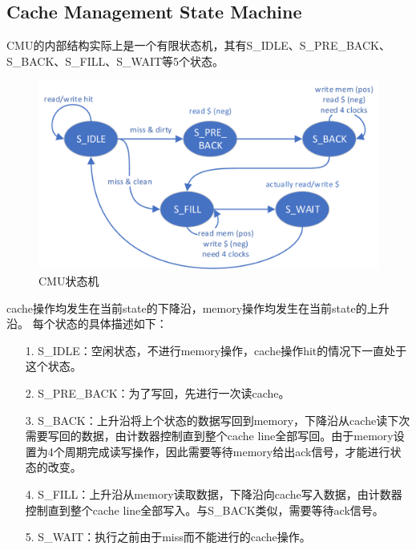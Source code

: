 \subsection{Cache Management State Machine}
CMU的内部结构实际上是一个有限状态机，其有S\_IDLE、S\_PRE\_BACK、S\_BACK、S\_FILL、S\_WAIT等5个状态。
\begin{figure}[H] %
	\centering %
	\includegraphics[width=1.0\textwidth]{figs/2.png} %
	\caption{CMU状态机} %
	\label{Fig.3} %
\end{figure}
cache操作均发生在当前state的下降沿，memory操作均发生在当前state的上升沿。 每个状态的具体描述如下：
\begin{itemize}
	\item [1.] S\_IDLE：空闲状态，不进行memory操作，cache操作hit的情况下一直处于这个状态。
	\item [2.] S\_PRE\_BACK：为了写回，先进行一次读cache。
	\item [3.] S\_BACK：上升沿将上个状态的数据写回到memory，下降沿从cache读下次需要写回的数据，由计数器控制直到整个cache line全部写回。由于memory设置为4个周期完成读写操作，因此需要等待memory给出ack信号，才能进行状态的改变。
	\item [4.] S\_FILL：上升沿从memory读取数据，下降沿向cache写入数据，由计数器控制直到整个cache line全部写入。与S\_BACK类似，需要等待ack信号。
	\item [5.] S\_WAIT：执行之前由于miss而不能进行的cache操作。
\end{itemize}
